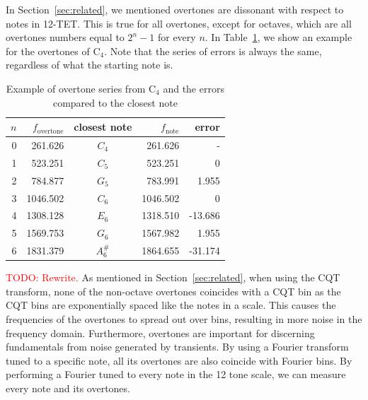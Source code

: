\documentclass[a4paper,10pt,twocolumn]{article}
\newcommand{\note}[2]{#1${}_{#2}$}
\begin{document}
In Section~\ref{sec:related}, we mentioned overtones are dissonant with respect to notes in 12-TET. This is true for all overtones, except for octaves, which are all overtones numbers equal to $2^n - 1$ for every $n$. In Table~\ref{tab:overseries}, we show an example for the overtones of \note{C}{4}. Note that the series of errors is always the same, regardless of what the starting note is. 
\begin{table}[h]
    \centering
    \begin{tabular}{rrcrr}
        $n$ & $f_{\text{overtone}}$ & closest note & $f_\text{note}$ & error \\
        \hline
        0 & 261.626  & $C_4$    & 261.626  &  - \\
        1 & 523.251  & $C_5$    & 523.251  &  0 \\
        2 & 784.877  & $G_5$    & 783.991  &  1.955 \\
        3 & 1046.502 & $C_6$    & 1046.502 &  0 \\
        4 & 1308.128 & $E_6$    & 1318.510 &  -13.686 \\
        5 & 1569.753 & $G_6$    & 1567.982 &  1.955 \\
        6 & 1831.379 & $A^\#_6$ & 1864.655 &  -31.174
    \end{tabular}
    \caption{Example of overtone series from \note{C}{4} and the errors compared to the closest note}
    \label{tab:overseries}
\end{table}

\textcolor{red}{TODO: Rewrite.}
As mentioned in Section~\ref{sec:related}, when using the CQT transform, none of the non-octave overtones coincides with a CQT bin as the CQT bins are exponentially spaced like the notes in a scale. This causes the frequencies of the overtones to spread out over bins, resulting in more noise in the frequency domain. Furthermore, overtones are important for discerning fundamentals from noise generated by transients. By using a Fourier transform tuned to a specific note, all its overtones are also coincide with Fourier bins. By performing a Fourier tuned to every note in the 12 tone scale, we can measure every note and its overtones.
\end{document}

